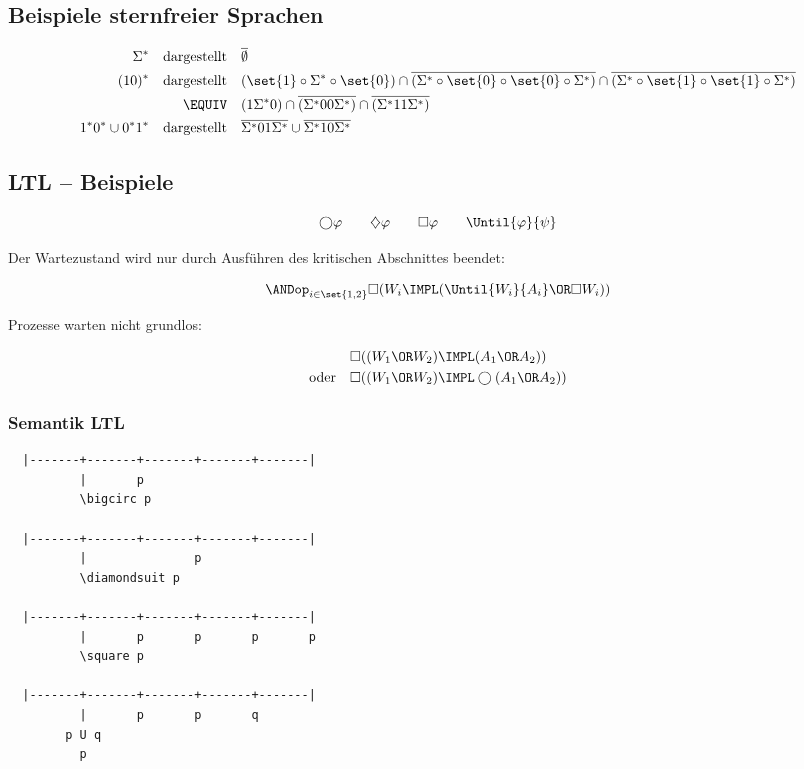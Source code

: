 \subsection{Beispiele sternfreier Sprachen}

\begin{align*}
  \Sigma^* 
    \quad\text{dargestellt}\quad&
    \overline{\emptyset} \\
  (10)^* 
    \quad\text{dargestellt}\quad&
    (\set{1}\circ\Sigma^*\circ\set{0}) \cap
      \overline{(\Sigma^*\circ\set{0}\circ\set{0}\circ\Sigma^*)} \cap
      \overline{(\Sigma^*\circ\set{1}\circ\set{1}\circ\Sigma^*)} \\
    \EQUIV\quad&
      (1\Sigma^*0) \cap \overline{(\Sigma^*00\Sigma^*)} \cap \overline{(\Sigma^*11\Sigma^*)} \\
  1^*0^*\cup 0^*1^*
    \quad\text{dargestellt}\quad&
    \overline{\Sigma^*01\Sigma^*} \cup \overline{\Sigma^*10\Sigma^*}
\end{align*}

\subsection{LTL -- Beispiele}

\[
  \bigcirc\varphi \qquad \diamondsuit\varphi \qquad \square\varphi \qquad \Until{\varphi}{\psi}
\]

Der Wartezustand wird nur durch Ausführen des kritischen Abschnittes beendet:

\[
  \ANDop_{i\in\set{1,2}} \square (W_i \IMPL (\Until{W_i}{A_i} \OR \square W_i))
\]

Prozesse warten nicht grundlos:

\begin{align*}
                    & \square ((W_1\OR W_2) \IMPL (A_1\OR A_2)) \\
  \text{oder} \quad & \square ((W_1\OR W_2) \IMPL \bigcirc(A_1\OR A_2))
\end{align*}

\subsubsection{Semantik LTL}

\begin{verbatim}
  |-------+-------+-------+-------+-------|
          |       p
          \bigcirc p

  |-------+-------+-------+-------+-------|
          |               p
          \diamondsuit p

  |-------+-------+-------+-------+-------|
          |       p       p       p       p
          \square p

  |-------+-------+-------+-------+-------|
          |       p       p       q
        p U q
          p
\end{verbatim}

